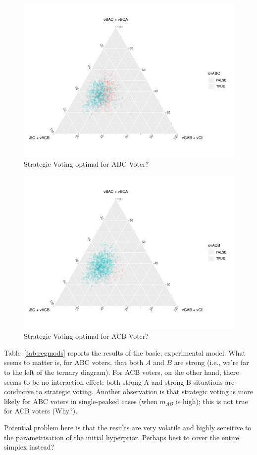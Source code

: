 \documentclass[11pt, letter, margin = 2 in]{article}
\begin{document}
\begin{figure}[!htb]
	\centering
	\includegraphics[width = 0.5 \textwidth]{../output/figures/regression/abc.pdf}
	\caption{Strategic Voting optimal for ABC Voter?}
	\label{fig:figure1}
\end{figure}

\begin{figure}[!htb]
	\centering
	\includegraphics[width = 0.5 \textwidth]{../output/figures/regression/acb.pdf}
	\caption{Strategic Voting optimal for ACB Voter?}
	\label{fig:figure1}
\end{figure}

Table~\ref{tab:regmods} reports the results of the basic, experimental model. What seems to matter is, for ABC voters, that both $A$ and $B$ are strong (i.e., we're far to the left of the ternary diagram). For ACB voters, on the other hand, there seems to be no interaction effect: both strong A and strong B situations are conducive to strategic voting. Another observation is that strategic voting is more likely for ABC voters in single-peaked cases (when $m_{AB}$ is high); this is not true for ACB voters (Why?).

Potential problem here is that the results are very volatile and highly sensitive to the parametrisation of the initial hyperprior. Perhaps best to cover the entire simplex instead?
\end{document}
